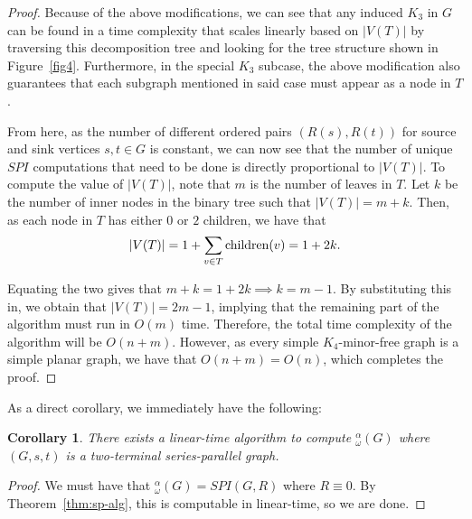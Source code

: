 \documentclass{article}
\newtheorem{cor}[thm]{Corollary}
\newcommand{\idq}{{}^{\alpha}_{\omega}}
\begin{document}
\begin{proof}
Because of the above modifications, we can see that any induced $K_3$ in $G$ can be found in a time complexity that scales linearly based on $|V(T)|$ by traversing this decomposition tree and looking for the tree structure shown in Figure~\ref{fig4}. Furthermore, in the special $K_3$ subcase, the above modification also guarantees that each subgraph mentioned in said case must appear as a node in $T$.

From here, as the number of different ordered pairs $(R(s), R(t))$ for source and sink vertices $s, t \in G$ is constant, we can now see that the number of unique $SPI$ computations that need to be done is directly proportional to $|V(T)|$. To compute the value of $|V(T)|$, note that $m$ is the number of leaves in $T$. Let $k$ be the number of inner nodes in the binary tree such that $|V(T)| = m + k$. Then, as each node in $T$ has either $0$ or $2$ children, we have that $$|V(T)| = 1 + \sum_{v \in T}\textnormal{children}(v) = 1 + 2k.$$

Equating the two gives that $m + k = 1 + 2k \implies k = m - 1$. By substituting this in, we obtain that $|V(T)| = 2m - 1$, implying that the remaining part of the algorithm must run in $O(m)$ time. Therefore, the total time complexity of the algorithm will be $O(n + m)$. However, as every simple $K_4$-minor-free graph is a simple planar graph, we have %
that $O(n + m) = O(n)$, which completes the proof.
\end{proof}

As a direct corollary, we immediately have the following:
\begin{cor}
    There exists a linear-time algorithm to compute $\idq(G)$ where $(G, s,t)$ is a two-terminal series-parallel graph.
\end{cor}
\begin{proof}
    We must have that $\idq(G) = SPI(G, R)$ where $R \equiv 0$. By Theorem~\ref{thm:sp-alg}, this is computable in linear-time, so we are done.
\end{proof}


\end{document}
